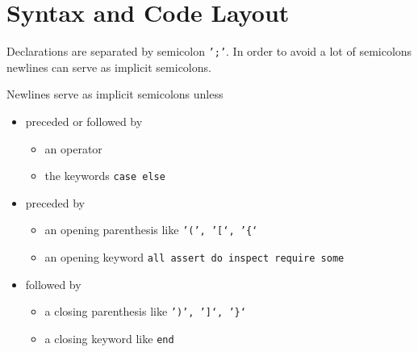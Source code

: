 \section{Syntax and Code Layout}

\lstset{language=alba}
Declarations are separated by semicolon {\tt ';'}. In order to avoid a lot of
semicolons newlines can serve as implicit semicolons.

Newlines serve as implicit semicolons unless
\begin{itemize}
\item preceded or followed by
  \begin{itemize}
    \item an operator
    \item the keywords \lstinline!case else!
  \end{itemize}
\item preceded by
  \begin{itemize}
  \item an opening parenthesis like {\tt '(', '[‘, '\{‘ }
  \item an opening keyword \lstinline!all assert do inspect require some!
  \end{itemize}
\item followed  by
  \begin{itemize}
    \item a closing parenthesis like {\tt ')', ']‘, '\}‘}
    \item a closing keyword like \lstinline!end!
  \end{itemize}
\end{itemize}



